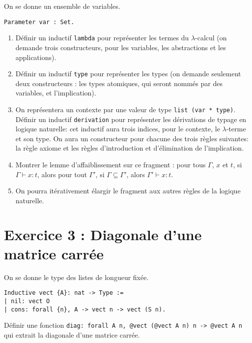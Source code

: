 \documentclass{article}
\begin{document}
On se donne un ensemble de variables.

\begin{verbatim}
Parameter var : Set.
\end{verbatim}

\begin{enumerate}
\item Définir un inductif \texttt{lambda} pour représenter les termes du \(\lambda\)-calcul (on demande trois constructeurs, pour les variables, les abstractions et les applications).
\item Définir un inductif \texttt{type} pour représenter les types (on demande seulement deux constructeurs : les types atomiques, qui seront nommés par des variables, et l'implication).
\item On représentera un contexte par une valeur de type \texttt{list (var * type)}. Définir un inductif \texttt{derivation} pour représenter les dérivations de typage en logique naturelle: cet inductif aura trois indices, pour le contexte, le \(\lambda\)-terme et son type. On aura un constructeur pour chacune des trois règles suivantes: la règle axiome et les règles d'introduction et d'élimination de l'implication.
\item Montrer le lemme d'affaiblissement sur ce fragment : pour tous \(\Gamma\), \(x\) et \(t\), si \(\Gamma \vdash x : t\), alors pour tout \(\Gamma'\), si \(\Gamma \subseteq \Gamma'\), alors \(\Gamma' \vdash x : t\).
\item On pourra itérativement élargir le fragment aux autres règles de la logique naturelle.
\end{enumerate}

\section*{Exercice 3 : Diagonale d'une matrice carrée}

On se donne le type des listes de longueur fixée.
\begin{verbatim}
Inductive vect {A}: nat -> Type := 
| nil: vect O
| cons: forall {n}, A -> vect n -> vect (S n).
\end{verbatim}

Définir une fonction \texttt{diag: forall A n, @vect (@vect A n) n -> @vect A n} qui extrait la diagonale d'une matrice carrée.
\end{document}
